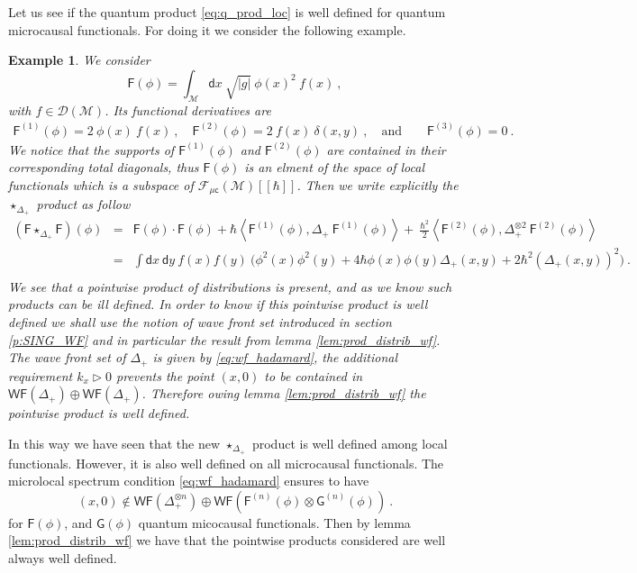 \documentclass[11pt]{book}
\newcommand{\WF}{\mathsf{WF}}
\newcommand{\muc}{\mu\csf}
\newcommand{\abs}[1]{\left|#1\right|}
\newcommand{\sm}[1]{\left\langle#1\right\rangle}
\newcommand{\Dcal}{\mathcal{D}}
\newcommand{\Fcal}{\mathcal{F}}
\newcommand{\Mcal}{\mathcal{M}}
\newcommand{\Fsf}{\mathsf{F}}
\newcommand{\Gsf}{\mathsf{G}}
\newcommand{\csf}{\mathsf{c}}
\newcommand{\dsf}{\mathsf{d}}
\theoremstyle{break}
\newtheorem{example}{Example}[chapter]
\begin{document}
Let us see if the quantum product \eqref{eq:q_prod_loc} is well defined for quantum microcausal functionals. For doing it we consider the following example.


\begin{example}
We consider 
%
\begin{equation}
\Fsf(\phi) = \int_\Mcal \dsf x \ \sqrt{\abs{g}} \ \phi(x)^2 \ f(x)  \ ,
\label{eq:exo_loc_obs}
\end{equation}
%
with $f \in \Dcal(\Mcal)$. Its functional derivatives are
%
\begin{eqnarray*}
\Fsf^{(1)}(\phi) = 2 \ \phi(x) \ f(x) \ , \quad \Fsf^{(2)}(\phi) = 2 \ f(x) \ \delta(x,y) \ , \quad \mbox{and} \qquad \Fsf^{(3)}(\phi) = 0 \ .
\end{eqnarray*}
%
We notice that the supports of $\Fsf^{(1)}(\phi)$ and $\Fsf^{(2)}(\phi)$ are contained in their corresponding total diagonals, thus $\Fsf(\phi)$ is an elment of the space of local functionals which is a subspace of $\Fcal_{\muc}(\Mcal)[[\hbar]]$. 
%
Then we write explicitly the $\star_{\Delta_+}$ product as follow
%
\begin{eqnarray}
(\Fsf \star_{\Delta_+} \Fsf)(\phi) &=& \Fsf(\phi) \cdot \Fsf(\phi) + \hbar \sm{ \Fsf^{(1)}(\phi) , \Delta_+ \ \Fsf^{(1)}(\phi) } + \ \frac{\hbar^2}{2} \sm{ \Fsf^{(2)}(\phi) , \Delta_+^{\otimes 2} \ \Fsf^{(2)}(\phi)} \nonumber \\
%
&=& \int \dsf x \ \dsf y \ f(x) f(y) \ \bigg( \phi^2(x) \phi^2(y) + 4 \hbar \phi(x) \phi(y) \Delta_+(x,y) + 2 \hbar^2 \left(\Delta_+(x,y)\right)^2 \bigg) \ . \nonumber \\
\label{eq:exo_loc_obs_prod_q}
\end{eqnarray}
%
We see that a pointwise product of distributions is present, and as we know such products can be ill defined. In order to know if this pointwise product is well defined we shall use the notion of wave front set introduced in section \ref{p:SING_WF} and in particular the result from lemma \ref{lem:prod_distrib_wf}. The wave front set of $\Delta_+$ is given by \eqref{eq:wf_hadamard}, the additional requirement $k_x \triangleright 0$ prevents the point $(x,0)$ to be contained in $\WF(\Delta_+) \oplus \WF(\Delta_+)$. Therefore owing lemma \ref{lem:prod_distrib_wf} the pointwise product is well defined.
\end{example}


In this way we have seen that the new $\star_{\Delta_+}$ product is well defined among local functionals. However, it is also well defined on all microcausal functionals. The microlocal spectrum condition \eqref{eq:wf_hadamard} ensures to have
%
\begin{equation*}
(x,0) \notin \WF(\Delta_+^{\otimes n}) \oplus \WF\left(\Fsf^{(n)}(\phi) \otimes \Gsf^{(n)}(\phi)\right) \ .
\end{equation*}
%
for $\Fsf(\phi)$, and $\Gsf(\phi)$ quantum micocausal functionals. Then by lemma \ref{lem:prod_distrib_wf} we have that the pointwise products considered are well always well defined.
\end{document}
